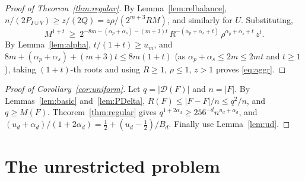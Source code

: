 \documentclass[11pt]{amsart}
\theoremstyle{definition}
\theoremstyle{remark}
\newcommand{\Dp}{\mathcal{D}}
\newcommand{\Mf}{M}
\begin{document}
\begin{proof}[Proof of Theorem~\ref{thm:regular}]
By Lemma~\ref{lem:relbalance}, $n/(2P_{I\cup V})\ge z/(2Q)=z\rho/(2^{m+3}R\Mf)$, and similarly for $U$. Substituting,
\[
\Mf^{1+t}\ \ge\ 2^{-8m-(\alpha_p+\alpha_s)-(m+3)t}\,R^{-(\alpha_p+\alpha_s+t)}\,\rho^{\alpha_p+\alpha_s+t}\,z^{t}.
\]
By Lemma~\ref{lem:alpha}, $t/(1+t)\ge u_m$, and $8m+(\alpha_p+\alpha_s)+(m+3)t\le8m(1+t)$ (as $\alpha_p+\alpha_s\le2m\le2mt$ and $t\ge1$), taking $(1+t)$-th roots and using $R\ge1$, $\rho\le1$, $z>1$ proves \eqref{eq:aggr}.
\end{proof}

\begin{proof}[Proof of Corollary~\ref{cor:uniform}]
Let $q=|\Dp(F)|$ and $n=|F|$. By Lemmas~\ref{lem:basic} and~\ref{lem:PDelta}, $R(F)\le|F-F|/n\le q^2/n$, and $q\ge\Mf(F)$. Theorem~\ref{thm:regular} gives $q^{1+2\alpha_d}\ge256^{-d}n^{u_d+\alpha_d}$, and $(u_d+\alpha_d)/(1+2\alpha_d)=\tfrac12+(u_d-\tfrac12)/B_d$. Finally use Lemma~\ref{lem:ud}.
\end{proof}

\section{The unrestricted problem}\label{sec:unrestricted}
\end{document}
